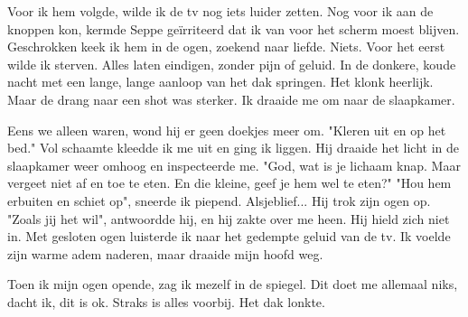 \documentclass[12pt, justified, a4paper, symmetric]{tufte-book}
\begin{document}
Voor ik hem volgde, wilde ik de tv nog iets luider zetten. Nog voor ik aan de knoppen kon, kermde Seppe ge\"irriteerd dat ik van voor het scherm moest blijven. Geschrokken keek ik hem in de ogen, zoekend naar liefde. Niets. Voor het eerst wilde ik sterven. Alles laten eindigen, zonder pijn of geluid. In de donkere, koude nacht met een lange, lange aanloop van het dak springen. Het klonk heerlijk. Maar de drang naar een shot was sterker. Ik draaide me om naar de slaapkamer.

Eens we alleen waren, wond hij er geen doekjes meer om. "Kleren uit en op het bed." Vol schaamte kleedde ik me uit en ging ik liggen. Hij draaide het licht in de slaapkamer weer omhoog en inspecteerde me. "God, wat is je lichaam knap. Maar vergeet niet af en toe te eten. En die kleine, geef je hem wel te eten?" "Hou hem erbuiten en schiet op", sneerde ik piepend. Alsjeblief... Hij trok zijn ogen op. "Zoals jij het wil", antwoordde hij, en hij zakte over me heen. Hij hield zich niet in. Met gesloten ogen luisterde ik naar het gedempte geluid van de tv. Ik voelde zijn warme adem naderen, maar draaide mijn hoofd weg.

Toen ik mijn ogen opende, zag ik mezelf in de spiegel. Dit doet me allemaal niks, dacht ik, dit is ok. Straks is alles voorbij. Het dak lonkte.
\end{document}
